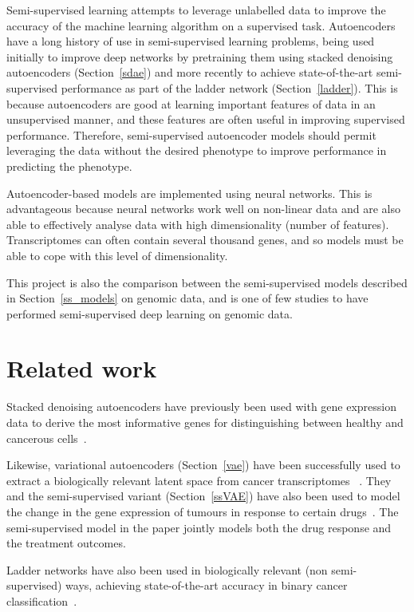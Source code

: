 Semi-supervised learning attempts to leverage unlabelled data to improve the accuracy of the machine learning
algorithm on a supervised task. Autoencoders have a long history of use in semi-supervised learning problems,
being used initially to improve deep networks by pretraining them using stacked denoising autoencoders (Section~\ref{sdae})
and more recently to achieve state-of-the-art semi-supervised performance as part of the ladder 
network (Section~\ref{ladder}). This is because autoencoders are good at learning 
important features of data in an unsupervised manner, and these features are often useful in improving 
supervised performance. Therefore, semi-supervised autoencoder models should permit leveraging the data without
the desired phenotype to improve performance in predicting the phenotype.

Autoencoder-based models are implemented
using neural networks. This is advantageous because neural networks work well on non-linear data and are
also able to effectively analyse data with high dimensionality (number of features). Transcriptomes can
often contain several thousand genes, and so models must be able to cope with this level of dimensionality.

This project is also the comparison between the semi-supervised models described in Section~\ref{ss_models} on genomic data, and is one of few
studies to have performed semi-supervised deep learning on genomic data.

\section{Related work}

Stacked denoising autoencoders have previously been used with gene expression data to derive the most informative
genes for distinguishing between healthy and cancerous cells~\cite{8217828}.

Likewise, variational autoencoders (Section~\ref{vae}) have been successfully used to extract a biologically relevant latent 
space from cancer transcriptomes ~\cite{Way2018ExtractingAB}. They and the semi-supervised variant (Section~\ref{ssVAE}) 
have also been used to model the change in the gene expression of tumours in response to certain drugs~\cite{10.1093/bioinformatics/btz158}.
The semi-supervised model in the paper jointly models both the drug response and the treatment outcomes.

Ladder networks have also been used in biologically relevant (non semi-supervised)
ways, achieving state-of-the-art accuracy in binary cancer classification~\cite{10.1007/978-3-319-78723-7_23}.